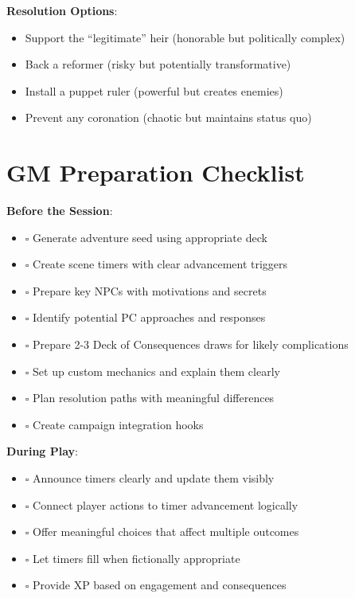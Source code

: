 \documentclass[11pt]{article}
\begin{document}
\begin{mdframed}[backgroundcolor=modulebg]
\textbf{Resolution Options}:
\begin{itemize}[leftmargin=*]
\item Support the ``legitimate'' heir (honorable but politically complex)
\item Back a reformer (risky but potentially transformative)
\item Install a puppet ruler (powerful but creates enemies)
\item Prevent any coronation (chaotic but maintains status quo)
\end{itemize}
\end{mdframed}

\section*{GM Preparation Checklist}

\begin{mdframed}[backgroundcolor=modulebg]
\textbf{Before the Session}:
\begin{itemize}[leftmargin=*]
\item $\square$ Generate adventure seed using appropriate deck
\item $\square$ Create scene timers with clear advancement triggers
\item $\square$ Prepare key NPCs with motivations and secrets
\item $\square$ Identify potential PC approaches and responses
\item $\square$ Prepare 2-3 Deck of Consequences draws for likely complications
\item $\square$ Set up custom mechanics and explain them clearly
\item $\square$ Plan resolution paths with meaningful differences
\item $\square$ Create campaign integration hooks
\end{itemize}

\textbf{During Play}:
\begin{itemize}[leftmargin=*]
\item $\square$ Announce timers clearly and update them visibly
\item $\square$ Connect player actions to timer advancement logically
\item $\square$ Offer meaningful choices that affect multiple outcomes
\item $\square$ Let timers fill when fictionally appropriate
\item $\square$ Provide XP based on engagement and consequences
\end{itemize}
\end{mdframed}
\end{document}
